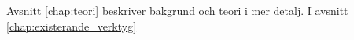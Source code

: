 Avsnitt \ref{chap:teori} beskriver bakgrund och teori i mer detalj. I avsnitt \ref{chap:existerande_verktyg}
